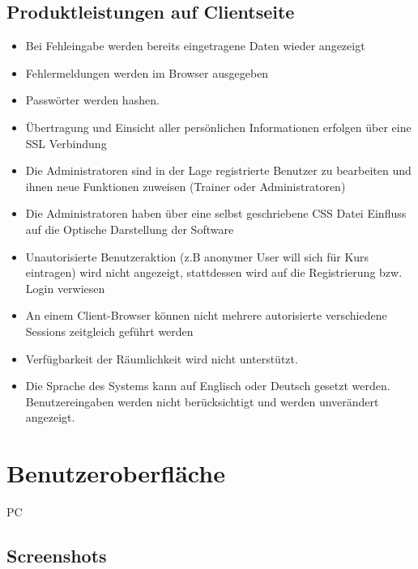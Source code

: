 \documentclass[a4paper]{scrreprt}
\begin{document}
	\section{Produktleistungen auf Clientseite}
			\begin{itemize}
				\item \Func{} Bei Fehleingabe werden bereits eingetragene Daten wieder angezeigt
				\item \Func{} Fehlermeldungen werden im Browser ausgegeben
				\item \Func{} Passwörter werden \gls{hashen}.
				\item \Func{} Übertragung und Einsicht aller persönlichen Informationen erfolgen über eine SSL Verbindung
				\item \Func{} Die Administratoren sind in der Lage registrierte Benutzer zu bearbeiten und ihnen neue Funktionen zuweisen (Trainer oder Administratoren)
				\item \Func{} Die Administratoren haben über eine selbst geschriebene CSS Datei Einfluss auf die Optische Darstellung der Software 
				\item \Func{} Unautorisierte Benutzeraktion (z.B anonymer User will sich für Kurs eintragen) wird nicht angezeigt, stattdessen wird auf die Registrierung bzw. Login verwiesen
				\item \Func{} An einem Client-Browser können nicht mehrere autorisierte verschiedene Sessions zeitgleich geführt werden
				\item \Func{} Verfügbarkeit der Räumlichkeit wird nicht unterstützt.
				\item \Func{} Die Sprache des Systems kann auf Englisch oder Deutsch gesetzt werden. Benutzereingaben werden nicht berücksichtigt und werden unverändert angezeigt.
			\end{itemize}
		
		
 
\chapter{Benutzeroberfläche}
	\begin{tiny}
		PC
	\end{tiny}
   
    \section{Screenshots}
    
	    \subsection{}
    
\end{document}
